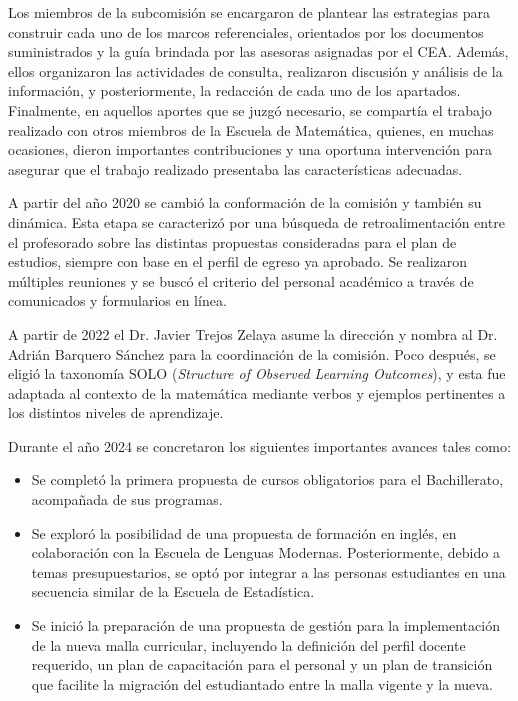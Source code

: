 Los miembros de la subcomisión se encargaron de plantear las estrategias para construir cada uno de los marcos referenciales, orientados por los documentos suministrados y la guía brindada por las asesoras asignadas por el CEA. Además, ellos organizaron las actividades de consulta, realizaron discusión y análisis de la información, y posteriormente, la redacción de cada uno de los apartados. Finalmente, en aquellos aportes que se juzgó necesario, se compartía el trabajo realizado con otros miembros de la Escuela de Matemática, quienes, en muchas ocasiones, dieron importantes contribuciones y una oportuna intervención para asegurar que el trabajo realizado presentaba las características adecuadas. 

A partir del año 2020 se cambió la conformación de la comisión y también su dinámica. Esta etapa se caracterizó por una búsqueda de retroalimentación entre el profesorado sobre las distintas propuestas consideradas para el plan de estudios, siempre con base en el perfil de egreso ya aprobado. Se realizaron múltiples reuniones y se buscó el criterio del personal académico a través de comunicados y formularios en línea. 

A partir de 2022 el Dr. Javier Trejos Zelaya asume la dirección y nombra al Dr. Adrián Barquero Sánchez para la coordinación de la comisión. Poco después, se eligió la taxonomía SOLO (\emph{Structure of Observed Learning Outcomes}), y esta fue adaptada al contexto de la matemática mediante verbos y ejemplos pertinentes a los distintos niveles de aprendizaje.  

Durante el año 2024 se concretaron los siguientes importantes avances tales como:
\begin{itemize}
  \item Se completó la primera propuesta de cursos obligatorios para el Bachillerato, acompañada de sus programas.  
  \item Se exploró la posibilidad de una propuesta de formación en inglés, en colaboración con la Escuela de Lenguas Modernas. Posteriormente, debido a temas presupuestarios, se optó por integrar a las personas estudiantes en una secuencia similar de la Escuela de Estadística.  
  \item Se inició la preparación de una propuesta de gestión para la implementación de la nueva malla curricular, incluyendo la definición del perfil docente requerido, un plan de capacitación para el personal y un plan de transición que facilite la migración del estudiantado entre la malla vigente y la nueva.  
\end{itemize}

